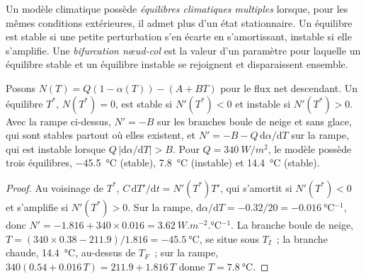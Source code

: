 \begin{definition}\label{def:b3:climate-models:multiple-equilibria}
Un modèle climatique possède \emph{équilibres climatiques multiples}
lorsque, pour les mêmes conditions extérieures, il admet plus d'un
état stationnaire. Un équilibre est stable si une petite perturbation
s'en écarte en s'amortissant, instable si elle s'amplifie. Une \emph{bifurcation
nœud-col} est la valeur d'un paramètre pour laquelle un équilibre
stable et un équilibre instable se rejoignent et disparaissent ensemble.
\end{definition}

\begin{proposition}\label{prop:b3:climate-models:three}
Posons $N(T) = Q(1 - \alpha(T)) - (A + BT)$ pour le flux net descendant. Un
équilibre $T^*$, $N(T^*) = 0$, est stable si $N'(T^*) < 0$ et instable si
$N'(T^*) > 0$. Avec la rampe ci-dessus, $N' = -B$ sur les branches boule de neige et
sans glace, qui sont stables partout où elles existent, et $N' = -B -
Q\,\mathrm d\alpha/\mathrm dT$ sur la rampe, qui est instable lorsque $Q\,
|\mathrm d\alpha/\mathrm dT| > B$. Pour $Q = \qty{340}{W/m^2}$, le modèle possède
trois équilibres, \qty{-45.5}{\celsius} (stable), \qty{7.8}{\celsius}
(instable) et \qty{14.4}{\celsius} (stable).
\end{proposition}

\begin{proof}
Au voisinage de $T^*$, $C\,\mathrm dT'/\mathrm dt = N'(T^*)T'$, qui s'amortit si
$N'(T^*) < 0$ et s'amplifie si $N'(T^*) > 0$. Sur la rampe, $\mathrm d\alpha/
\mathrm dT = -0.32/20 = \qty{-0.016}{\celsius^{-1}}$, donc $N' = -1.816 + 340
\times 0.016 = \qty{+3.62}{W.m^{-2}.\celsius^{-1}}$. La branche boule de neige,
$T = (340\times0.38 - 211.9)/1.816 = \qty{-45.5}{\celsius}$, se situe sous
$T_I$~; la branche chaude, \qty{14.4}{\celsius}, au-dessus de $T_F$~; sur la rampe,
$340(0.54 + 0.016\,T) = 211.9 + 1.816\,T$ donne $T = \qty{7.8}{\celsius}$.
\end{proof}

